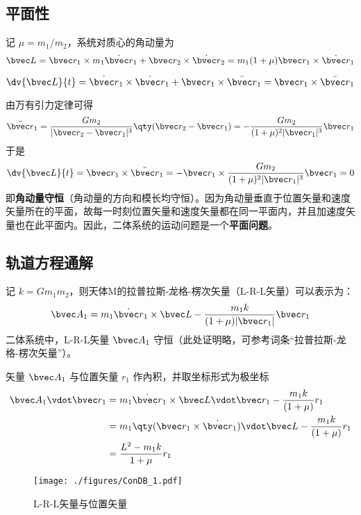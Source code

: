 \subsection{平面性}
 记 $\mu=m_1/m_2$，系统对质心的角动量为
\begin{equation}
\bvec L =\bvec r_1 \times m_1 \dot{\bvec r}_1+ \bvec r_2 \times \dot{\bvec r}_2 = m_1 (1+\mu)\bvec r_1 \times \dot{\bvec r}_1
\end{equation}

\begin{equation}
\dv{\bvec L}{t} = \dot{\bvec r}_1 \times \dot{\bvec r}_1 + \bvec r_1 \times \ddot{\bvec r}_1=\bvec r_1 \times \ddot{\bvec r}_1
\end{equation}

由万有引力定律可得
\begin{equation}\label{ConDB_eq4}
\ddot{\bvec r}_1 = \frac{Gm_2}{|\bvec r_2 - \bvec r_1|^3} \qty(\bvec r_2 - \bvec r_1) = - \frac{Gm_2}{(1+\mu)^2|\bvec r_1|^3}\bvec r_1
\end{equation}
于是
\begin{equation}
\dv{\bvec L}{t} =\bvec r_1 \times \ddot{\bvec r}_1= -\bvec r_1 \times \frac{Gm_2}{(1+\mu)^2|\bvec r_1|^3}\bvec r_1= 0
\end{equation}
即\textbf{角动量守恒}（角动量的方向和模长均守恒）。因为角动量垂直于位置矢量和速度矢量所在的平面，故每一时刻位置矢量和速度矢量都在同一平面内，并且加速度矢量也在此平面内。因此，二体系统的运动问题是一个\textbf{平面问题}。

\subsection{轨道方程通解}
记 $k=Gm_1m_2$，则天体M的拉普拉斯-龙格-楞次矢量（L-R-L矢量）可以表示为：
\begin{equation}
\bvec A_1 = m_1\dot{\bvec r}_1 \times \bvec L - \frac{m_1k}{(1+\mu)|\bvec r_1|}\bvec r_1
\end{equation}
二体系统中，L-R-L矢量 $\bvec A_1$ 守恒（此处证明略，可参考词条“拉普拉斯-龙格-楞次矢量”）。

矢量 $\bvec A_1$ 与位置矢量 $r_1$ 作內积，并取坐标形式为极坐标
\begin{equation}\label{ConDB_eq7}
\begin{aligned}
\bvec A_1 \vdot \bvec r_1 &= m_1\dot{\bvec r}_1 \times \bvec L \vdot \bvec r_1 - \frac{m_1k}{(1+\mu)}r_1\\
&= m_1\qty(\bvec r_1 \times \dot{\bvec r}_1)\vdot \bvec L - \frac{m_1k}{(1+\mu)}r_1 \\
&= \frac{L^2-m_1k}{1+\mu}r_1
\end{aligned}
\end{equation}
\begin{figure}[ht]
\centering
\texttt{[image: ./figures/ConDB\_1.pdf]}
\caption{L-R-L矢量与位置矢量} \label{ConDB_fig1}
\end{figure}

